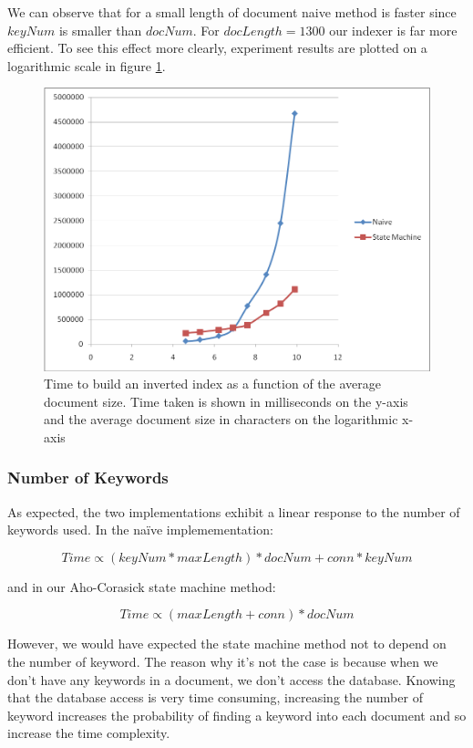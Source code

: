 \documentclass[10pt]{article}
\begin{document}
We can observe that for a small length of document naive method is
faster since \(keyNum\) is smaller than \(docNum\). For \(docLength = 1300\)
our indexer is far more efficient. To see this effect more clearly,
experiment results are plotted on a logarithmic scale in figure
\ref{fig:naivedocumentsizelog}.

\begin{figure}[h!]
  \begin{center}
    \includegraphics[width=\textwidth,height=!]{naivedocumentsizelog}
  \end{center}
  \caption{Time to build an inverted index as a function of the
      average document size. Time taken is shown in milliseconds on the
      y-axis and the average document size in characters on the
      logarithmic x-axis}
  \label{fig:naivedocumentsizelog}
\end{figure} 


\subsubsection{Number of Keywords}
As expected, the two implementations exhibit a linear response to the
number of keywords used. In the na\"{i}ve implemementation:

\[Time \propto (keyNum * maxLength) * docNum + conn * keyNum\]

and in our Aho-Corasick state machine method: 

\[Time \propto (maxLength + conn) * docNum \]

However, we would have expected the state machine method not to depend
on the number of keyword. The reason why it’s not the case is because
when we don’t have any keywords in a document, we don’t access the
database. Knowing that the database access is very time consuming,
increasing the number of keyword increases the probability of finding a
keyword into each document and so increase the time complexity.  
\end{document}

